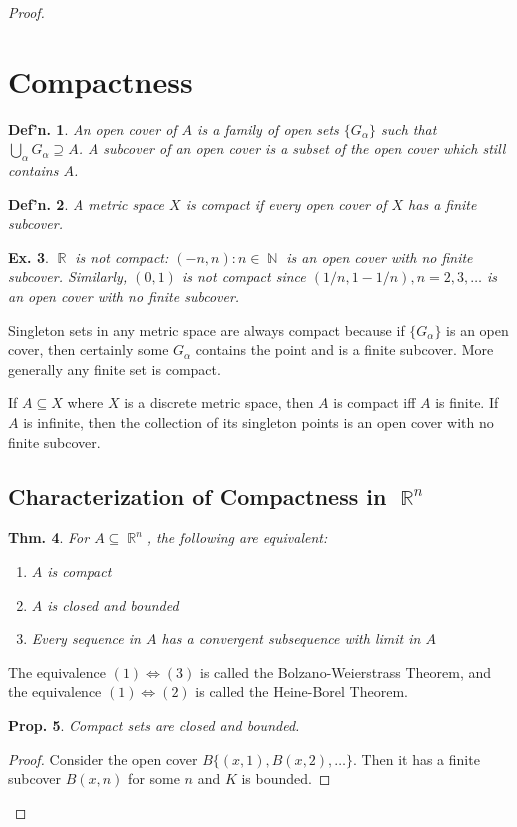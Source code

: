 \documentclass[12pt, a4paper]{book}
\DeclareMathOperator{\N}{\mathbb{N}}
\DeclareMathOperator{\R}{\mathbb{R}}
\newtheorem{theorem}{Thm.}[section]
\newtheorem{definition}[theorem]{Def'n.}
\newtheorem{proposition}[theorem]{Prop.}
\newtheorem{example}[theorem]{Ex.}
\theoremstyle{nonumberplain}
\newtheorem{proof}{Proof}
\begin{document}
\begin{proof}
\section{Compactness}
\begin{definition}
    An \textit{open cover} of $A$ is a family of open sets $\{G_\alpha\}$ such that $\bigcup_\alpha G_\alpha\supseteq A$.
    A subcover of an open cover is a subset of the open cover which still contains $A$.
\end{definition}
\begin{definition}
    A metric space $X$ is \textit{compact} if every open cover of $X$ has a finite subcover.
\end{definition}
\begin{example}
    $\R$ is not compact: $(-n,n):n\in\N$ is an open cover with no finite subcover. Similarly, $(0,1)$ is not compact
    since $(1/n,1-1/n),n=2,3,\ldots$ is an open cover with no finite subcover.
\end{example}
Singleton sets in any metric space are always compact because if $\{G_\alpha\}$ is an open cover, then certainly
some $G_\alpha$ contains the point and is a finite subcover. More generally any finite set is compact.

If $A\subseteq X$ where $X$ is a discrete metric space, then $A$ is compact iff $A$ is finite. If $A$ is infinite, then
the collection of its singleton points is an open cover with no finite subcover.

\subsection{Characterization of Compactness in $\R^n$}
\begin{theorem}
    For $A\subseteq\R^n$, the following are equivalent:
    \begin{enumerate}
        \item $A$ is compact
        \item $A$ is closed and bounded
        \item Every sequence in $A$ has a convergent subsequence with limit in $A$
    \end{enumerate}
\end{theorem}
The equivalence $(1)\Leftrightarrow(3)$ is called the Bolzano-Weierstrass Theorem, and the equivalence $(1)\Leftrightarrow(2)$
is called the Heine-Borel Theorem.
\begin{proposition}
    Compact sets are closed and bounded.
\end{proposition}
\begin{proof}
    Consider the open cover $B\{(x,1),B(x,2),\ldots\}$. Then it has a finite subcover $B(x,n)$ for some $n$ and $K$ is
    bounded.


\end{proof}
\end{proof}
\end{document}
